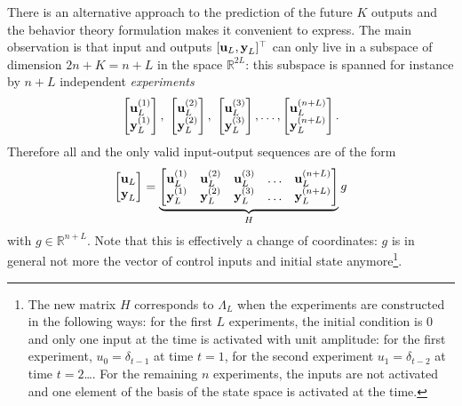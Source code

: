 There is an alternative approach to the prediction of the future $K$ outputs and the behavior theory formulation makes it convenient to express. The main observation is that input and outputs $[\boldsymbol{\mathrm{u}}_L,\boldsymbol{\mathrm{y}}_L]^\top$ can only live in a subspace of dimension $2n+K=n+L$ in the space $\mathbb{R}^{2L}$: this subspace is spanned for instance by $n+L$ independent \emph{experiments}
\begin{equation*}
  \begin{bmatrix}
    \boldsymbol{\mathrm{u}}_L^{(1)} \\ \boldsymbol{\mathrm{y}}_L^{(1)}
  \end{bmatrix},\
  \begin{bmatrix}
    \boldsymbol{\mathrm{u}}_L^{(2)} \\ \boldsymbol{\mathrm{y}}_L^{(2)}
  \end{bmatrix},\
  \begin{bmatrix}
    \boldsymbol{\mathrm{u}}_L^{(3)} \\ \boldsymbol{\mathrm{y}}_L^{(3)}
  \end{bmatrix},\ldots,
  \begin{bmatrix}
    \boldsymbol{\mathrm{u}}_L^{(n+L)} \\ \boldsymbol{\mathrm{y}}_L^{(n+L)}
  \end{bmatrix}.
\end{equation*}
Therefore all and the only valid input-output sequences are of the form
\begin{equation*}
  \begin{bmatrix}
    \boldsymbol{\mathrm{u}}_L \\ \boldsymbol{\mathrm{y}}_L
  \end{bmatrix} = \underbrace{
  \begin{bmatrix}
    \boldsymbol{\mathrm{u}}_L^{(1)} & \boldsymbol{\mathrm{u}}_L^{(2)} & \boldsymbol{\mathrm{u}}_L^{(3)} & \ldots & \boldsymbol{\mathrm{u}}_L^{(n+L)} \\
    \boldsymbol{\mathrm{y}}_L^{(1)} & \boldsymbol{\mathrm{y}}_L^{(2)} & \boldsymbol{\mathrm{y}}_L^{(3)} & \ldots & \boldsymbol{\mathrm{y}}_L^{(n+L)}
  \end{bmatrix}}_{H}g
\end{equation*}
with $g\in\mathbb{R}^{n+L}$. Note that this is effectively a change of coordinates: $g$ is in general not more the vector of control inputs and initial state anymore\footnote{The new matrix $H$ corresponds to $\Lambda_L$ when the experiments are constructed in the following ways: for the first $L$ experiments, the initial condition is 0 and only one input at the time is activated with unit amplitude: for the first experiment, $u_0=\delta_{t-1}$ at time $t=1$, for the second experiment $u_1=\delta_{t-2}$ at time $t=2$\ldots. For the remaining $n$ experiments, the inputs are not activated and one element of the basis of the state space is activated at the time.}.

